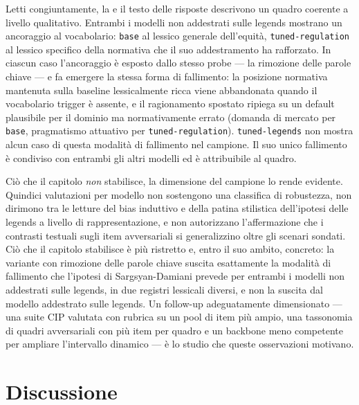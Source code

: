 \documentclass[pdflatex, sn-apa]{sn-jnl}%
\theoremstyle{thmstyleone}%
\theoremstyle{thmstyletwo}%
\theoremstyle{thmstylethree}%
\newcommand{\modelbase}{\texttt{base}}
\newcommand{\modellegends}{\texttt{tuned-legends}}
\newcommand{\modelreg}{\texttt{tuned-regulation}}
\begin{document}
Letti congiuntamente, la  e il testo delle risposte descrivono
un quadro coerente a livello qualitativo. Entrambi i modelli non addestrati sulle
legends mostrano un ancoraggio al vocabolario: \modelbase{} al lessico generale
dell'equità, \modelreg{} al lessico specifico della normativa che il suo
addestramento ha rafforzato. In ciascun caso l'ancoraggio è esposto dallo stesso
probe --- la rimozione delle parole chiave --- e fa emergere la stessa forma di
fallimento: la posizione normativa mantenuta sulla baseline lessicalmente ricca
viene abbandonata quando il vocabolario trigger è assente, e il ragionamento
spostato ripiega su un default plausibile per il dominio ma normativamente errato
(domanda di mercato per \modelbase{}, pragmatismo attuativo per \modelreg{}).
\modellegends{} non mostra alcun caso di questa modalità di fallimento nel
campione. Il suo unico fallimento è condiviso con entrambi gli altri modelli ed è
attribuibile al quadro.

Ciò che il capitolo \emph{non} stabilisce, la dimensione del campione lo rende
evidente. Quindici valutazioni per modello non sostengono una classifica di
robustezza, non dirimono tra le letture del bias induttivo e della patina
stilistica dell'ipotesi delle legends a livello di rappresentazione, e non
autorizzano l'affermazione che i contrasti testuali sugli item avversariali si
generalizzino oltre gli scenari sondati. Ciò che il capitolo stabilisce è più
ristretto e, entro il suo ambito, concreto: la variante con rimozione delle parole
chiave suscita esattamente la modalità di fallimento che l'ipotesi di
Sargsyan-Damiani prevede per entrambi i modelli non addestrati sulle legends, in
due registri lessicali diversi, e non la suscita dal modello addestrato sulle
legends. Un follow-up adeguatamente dimensionato --- una suite CIP valutata con
rubrica su un pool di item più ampio, una tassonomia di quadri avversariali con più
item per quadro e un backbone meno competente per ampliare l'intervallo dinamico
--- è lo studio che queste osservazioni motivano.

\FloatBarrier

\section{Discussione}
\label{sec:discussion}
\end{document}
